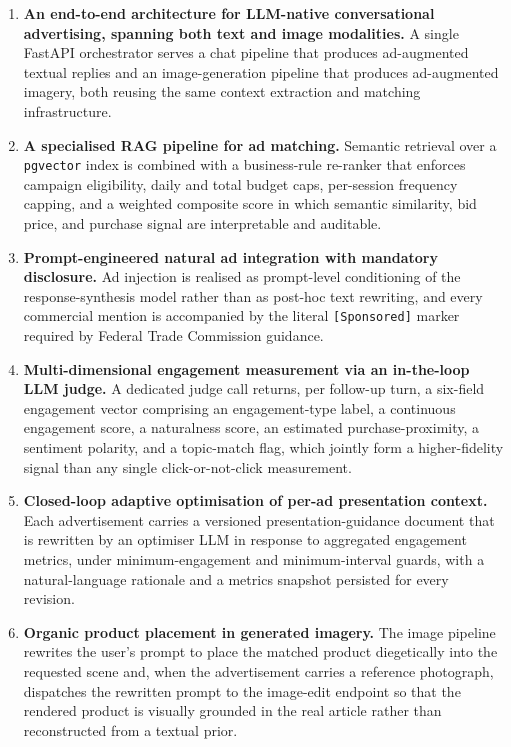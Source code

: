 \begin{enumerate}[label=(\roman*), leftmargin=2.5em]
  \item \textbf{An end-to-end architecture for LLM-native
    conversational advertising, spanning both text and image
    modalities.} A single FastAPI orchestrator serves a chat pipeline
    that produces ad-augmented textual replies and an image-generation
    pipeline that produces ad-augmented imagery, both reusing the
    same context extraction and matching infrastructure.

  \item \textbf{A specialised RAG pipeline for ad matching.} Semantic
    retrieval over a \texttt{pgvector} index is combined with a
    business-rule re-ranker that enforces campaign eligibility, daily
    and total budget caps, per-session frequency capping, and a
    weighted composite score in which semantic similarity, bid price,
    and purchase signal are interpretable and auditable.

  \item \textbf{Prompt-engineered natural ad integration with
    mandatory disclosure.} Ad injection is realised as
    prompt-level conditioning of the response-synthesis model rather
    than as post-hoc text rewriting, and every commercial mention is
    accompanied by the literal \texttt{[Sponsored]} marker required by
    Federal Trade Commission guidance.

  \item \textbf{Multi-dimensional engagement measurement via an
    in-the-loop LLM judge.} A dedicated judge call returns, per
    follow-up turn, a six-field engagement vector comprising an
    engagement-type label, a continuous engagement score, a
    naturalness score, an estimated purchase-proximity, a sentiment
    polarity, and a topic-match flag, which jointly form a
    higher-fidelity signal than any single click-or-not-click
    measurement.

  \item \textbf{Closed-loop adaptive optimisation of per-ad
    presentation context.} Each advertisement carries a versioned
    presentation-guidance document that is rewritten by an optimiser
    LLM in response to aggregated engagement metrics, under
    minimum-engagement and minimum-interval guards, with a
    natural-language rationale and a metrics snapshot persisted for
    every revision.

  \item \textbf{Organic product placement in generated imagery.} The
    image pipeline rewrites the user's prompt to place the matched
    product diegetically into the requested scene and, when the
    advertisement carries a reference photograph, dispatches the
    rewritten prompt to the image-edit endpoint so that the rendered
    product is visually grounded in the real article rather than
    reconstructed from a textual prior.


\end{enumerate}
